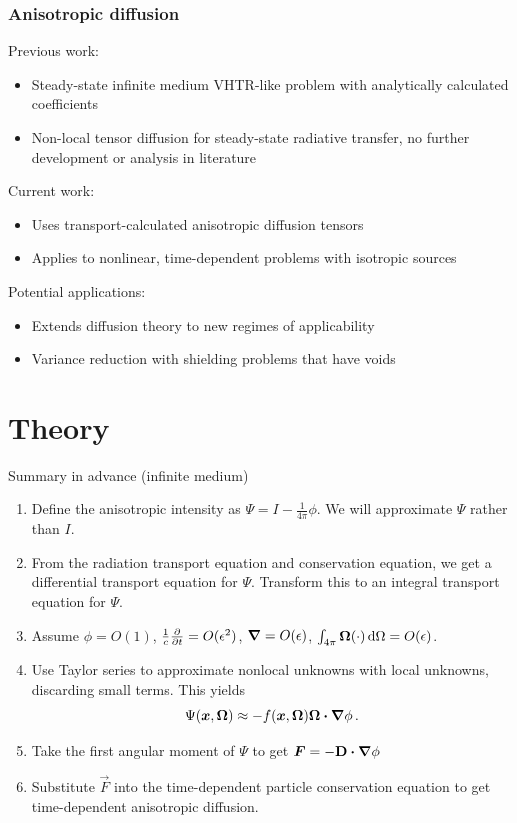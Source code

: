 \documentclass{beamer}
\begin{document}
\begin{frame}
  \frametitle{Anisotropic diffusion}
  Previous work:
  \begin{itemize}
    \item Steady-state infinite medium VHTR-like problem with analytically
      calculated coefficients \cite{Lar2009c}
    \item Non-local tensor diffusion \cite{Mor2007} for steady-state
      radiative transfer, no further development or analysis in literature
  \end{itemize}
  Current work:
  \begin{itemize}
    \item Uses transport-calculated anisotropic diffusion tensors
    \item Applies to nonlinear, time-dependent problems with isotropic sources
  \end{itemize}
  Potential applications:
  \begin{itemize}
    \item Extends diffusion theory to new regimes of applicability
    \item Variance reduction with shielding problems that have voids
  \end{itemize}
\end{frame}

\section{Theory}
\begin{frame}{Summary in advance (infinite medium)}
\begin{enumerate}
  \item Define the anisotropic intensity as $\Psi = I - \frac{1}{4\pi}\phi$.
    We will approximate $\Psi$ rather than $I$.
  \item From the radiation transport equation and conservation equation, we get
    a differential transport equation for $\Psi$. Transform this to an integral
    transport equation for $\Psi$.
  \item Assume $\phi=O(1)$, $\frac1c\frac{\partial }{\partial t}=O(\epsilon^2)$, $\bm{\nabla} =
    O(\epsilon)$, $\int_{4\pi} \bm{\Omega} (\cdot) \mathop{}\!\mathrm{d} \Omega = O(\epsilon)$.
  \item Use Taylor series to approximate nonlocal unknowns with local
    unknowns, discarding small terms. This yields
    \begin{equation*}
      \Psi(\bm{x}, \bm{\Omega})
      \approx - f(\bm{x}, \bm{\Omega})  \bm{\Omega} \bm{\cdot} \bm{\nabla} \phi\,.
    \end{equation*}
  \item Take the first angular moment of $\Psi$ to get $\bm{F}=-\mathbf{D} \bm{\cdot}
    \bm{\nabla} \phi$
  \item Substitute $\vec{F}$ into the time-dependent particle
    conservation equation to get time-dependent anisotropic diffusion.
\end{enumerate}
\end{frame}
\end{document}
